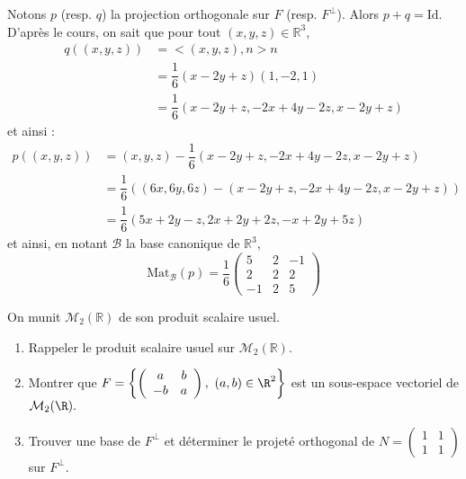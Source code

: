 \documentclass[a4paper,10pt]{report}
\begin{document}
\medskip

\noindent Notons $p$ (resp. $q$) la projection orthogonale sur $F$ (resp. $F^{\perp}$). Alors $p+q=\textrm{Id}$. D'après le cours, on sait que pour tout $(x,y,z) \in \mathbb{R}^3$,
\begin{align*}
 q((x,y,z)) & = <(x,y,z),n>n  \\
 & = \dfrac{1}{6} (x-2y+z) (1,-2,1) \\
 & = \dfrac{1}{6} (x-2y+z,-2x+4y-2z,x-2y+z) 
 \end{align*}
 et ainsi :
 \begin{align*}
p((x,y,z)) & = (x,y,z) - \dfrac{1}{6} (x-2y+z,-2x+4y-2z,x-2y+z)  \\
& = \dfrac{1}{6} ( (6x,6y,6z) - (x-2y+z,-2x+4y-2z,x-2y+z)) \\
& = \dfrac{1}{6}(5x+2y-z, 2x+2y+2z,-x+2y+5z)
\end{align*}
et ainsi, en notant $\mathcal{B}$ la base canonique de $\mathbb{R}^3$,
$$ \textrm{Mat}_{\mathcal{B}}(p) = \dfrac{1}{6} \begin{pmatrix}
5 & 2& -1 \\
2 & 2 & 2 \\
-1 & 2& 5
\end{pmatrix}$$

 \begin{Exercice}{} On munit $\mathcal{M}_2(\mathbb{R})$ de son produit scalaire usuel.
\begin{enumerate}
\item Rappeler le produit scalaire usuel sur $\mathcal{M}_{2}(\mathbb{R})$. 
\item Montrer que $F=\left\{\left(\begin{array}{cc} a & b\\ -b & a \end{array}\right),\ (a,b)\in\R^2\right
\}$ est un sous-espace vectoriel de ${\cal M}_2(\R).$
\item Trouver une base de $F^{\perp}$ et d\'eterminer le projet\'e orthogonal de $N=\left(\begin{array}{cc} 1&1\\ 1&1 \end{array}\right)$ sur $F^{\perp}$.
\end{enumerate}
\end{Exercice}

\corr 
\end{document}
